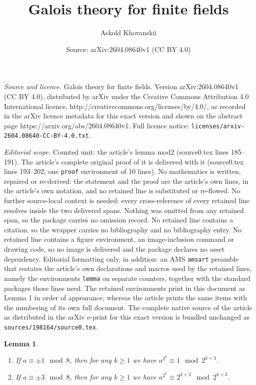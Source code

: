\documentclass[10pt,a4paper]{amsart}
\title{Galois theory for finite fields}
\author{Askold Khovanskii}
\date{Source: arXiv:2604.08640v1 (CC BY 4.0)}
\newtheorem{lemma}{Lemma}
\begin{document}
\maketitle

\noindent\emph{Source and licence.} Galois theory for finite fields. Version arXiv:2604.08640v1 (CC BY 4.0), distributed by arXiv under the Creative Commons Attribution 4.0 International licence, http://creativecommons.org/licenses/by/4.0/, as recorded in the arXiv licence metadata for this exact version and shown on the abstract page https://arxiv.org/abs/2604.08640v1. Full licence notice: \texttt{licenses/arxiv-2604.08640-CC-BY-4.0.txt}.\par\smallskip

\noindent\textit{Editorial scope.} Counted unit: the article's lemma mod2 (source0.tex lines 185--191). The article's complete original proof of it is delivered with it (source0.tex lines 193--202, one \texttt{proof} environment of 10 lines). No mathematics is written, repaired or re-derived: the statement and the proof are the article's own lines, in the article's own notation, and no retained line is substituted or re-flowed.  No further source-local context is needed: every cross-reference of every retained line resolves inside the two delivered spans.  Nothing was omitted from any retained span, so the package carries no omission record.  No retained line contains a citation, so the wrapper carries no bibliography and no bibliography entry.  No retained line contains a figure environment, an image-inclusion command or drawing code, so no image is delivered and the package declares no asset dependency.  Editorial formatting only, in addition: an AMS \texttt{amsart} preamble that restates the article's own declarations and macros used by the retained lines, namely the environments \texttt{lemma} on separate counters, together with the standard packages those lines need.  The retained environments print in this document as Lemma 1 in order of appearance, whereas the article prints the same items with the numbering of its own full document.  The complete native source of the article as distributed in the arXiv e-print for this exact version is bundled unchanged as \texttt{sources/198164/source0.tex}.
\begin{lemma}\label{mod2}
\begin{enumerate}
 \item If $a\equiv \pm 1\mod 8$, then for any $k\geq 1$ we have $a^{2^k}\equiv 1\mod2^{k+3} $.

\item  If $a\equiv \pm 3\mod 8$, then for any $k \geq  1$ we have $a^{2^k}\equiv 2^{k+2} \mod2^{k+3} $.
\end{enumerate}
\end{lemma}
\end{document}
